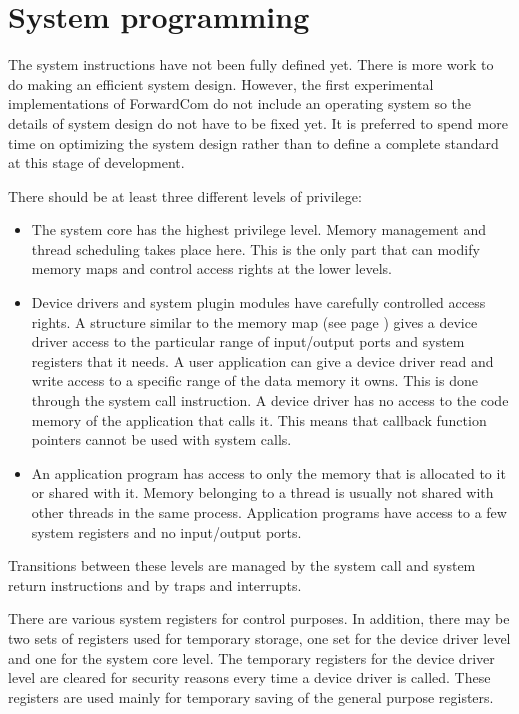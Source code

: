 \documentclass[forwardcom.tex]{subfiles}
\begin{document}
\RaggedRight

\chapter{System programming}

The system instructions have not been fully defined yet. There is more work to do making an efficient system design. However, the first experimental implementations of ForwardCom do not include an operating system so the details of system design do not have to be fixed yet. It is preferred to spend more time on optimizing the system design rather than to define a complete standard at this stage of development.
\vv

There should be at least three different levels of privilege:
\begin{itemize}
\item The system core has the highest privilege level. Memory management and thread scheduling takes place here. This is the only part that can modify memory maps and control access rights at the lower levels.

\item Device drivers and system plugin modules have carefully controlled access rights. A structure similar to the memory map (see page \pageref{memoryManagement}) gives a device driver access to the particular range of input/output ports and system registers that it needs. A user application can give a device driver read and write access to a specific range of the data memory it owns. This is done through the system call instruction. A device driver has no access to the code memory of the application that calls it. This means that callback function pointers cannot be used with system calls.

\item An application program has access to only the memory that is allocated to it or shared with it. Memory belonging to a thread is usually not shared with other threads in the same process. Application programs have access to a few system registers and no input/output ports.

\end{itemize}

Transitions between these levels are managed by the system call and system return instructions and by traps and interrupts.
\vv

There are various system registers for control purposes. In addition, there may be two sets of registers used for temporary storage, one set for the device driver level and one for the system core level. The temporary registers for the device driver level are cleared for security reasons every time a device driver is called. These registers are used mainly for temporary saving of the general purpose registers.
\end{document}
